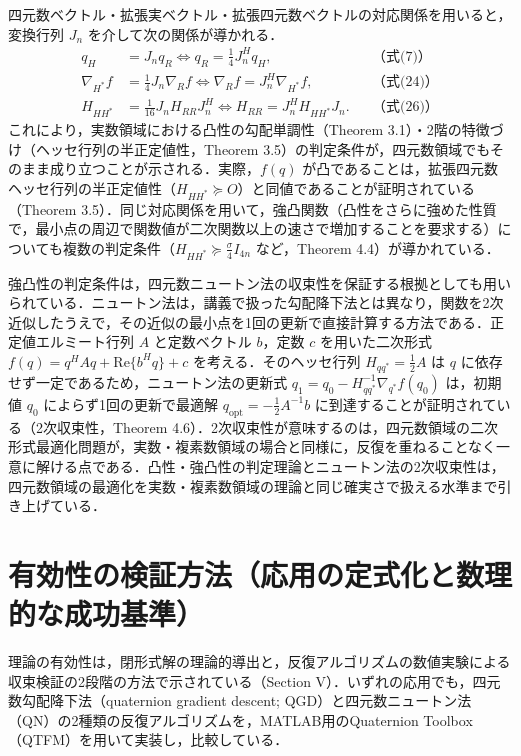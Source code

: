 \documentclass[twocolumn, 9pt]{jsarticle}
\begin{document}
四元数ベクトル・拡張実ベクトル・拡張四元数ベクトルの対応関係を用いると，変換行列 $J_n$ を介して次の関係が導かれる．
\begin{align*}
q_H &= J_nq_R \iff q_R = \tfrac{1}{4}J_n^Hq_H, &&\text{（式(7)）}\\
\nabla_{H^*}f &= \tfrac{1}{4}J_n\nabla_Rf \iff \nabla_Rf = J_n^H\nabla_{H^*}f, &&\text{（式(24)）}\\
H_{HH^*} &= \tfrac{1}{16}J_nH_{RR}J_n^H \iff H_{RR} = J_n^HH_{HH^*}J_n. &&\text{（式(26)）}
\end{align*}
これにより，実数領域における凸性の勾配単調性（Theorem 3.1）・2階の特徴づけ（ヘッセ行列の半正定値性，Theorem 3.5）の判定条件が，四元数領域でもそのまま成り立つことが示される．実際，$f(q)$ が凸であることは，拡張四元数ヘッセ行列の半正定値性（$H_{HH^*} \succeq O$）と同値であることが証明されている（Theorem 3.5）．同じ対応関係を用いて，強凸関数（凸性をさらに強めた性質で，最小点の周辺で関数値が二次関数以上の速さで増加することを要求する）についても複数の判定条件（$H_{HH^*} \succeq \frac{\sigma}{4} I_{4n}$ など，Theorem 4.4）が導かれている．

強凸性の判定条件は，四元数ニュートン法の収束性を保証する根拠としても用いられている．ニュートン法は，講義で扱った勾配降下法とは異なり，関数を2次近似したうえで，その近似の最小点を1回の更新で直接計算する方法である．正定値エルミート行列 $A$ と定数ベクトル $b$，定数 $c$ を用いた二次形式 $f(q) = q^H A q + \mathrm{Re}\{b^H q\} + c$ を考える．そのヘッセ行列 $H_{qq^*} = \frac{1}{2}A$ は $q$ に依存せず一定であるため，ニュートン法の更新式 $q_1 = q_0 - H_{qq^*}^{-1} \nabla_{q^*} f(q_0)$ は，初期値 $q_0$ によらず1回の更新で最適解 $q_{\mathrm{opt}} = -\frac{1}{2}A^{-1}b$ に到達することが証明されている（2次収束性，Theorem 4.6）．2次収束性が意味するのは，四元数領域の二次形式最適化問題が，実数・複素数領域の場合と同様に，反復を重ねることなく一意に解ける点である．凸性・強凸性の判定理論とニュートン法の2次収束性は，四元数領域の最適化を実数・複素数領域の理論と同じ確実さで扱える水準まで引き上げている．

\section{有効性の検証方法（応用の定式化と数理的な成功基準）}

理論の有効性は，閉形式解の理論的導出と，反復アルゴリズムの数値実験による収束検証の2段階の方法で示されている（Section V）．いずれの応用でも，四元数勾配降下法（quaternion gradient descent; QGD）と四元数ニュートン法（QN）の2種類の反復アルゴリズムを，MATLAB用のQuaternion Toolbox（QTFM）を用いて実装し，比較している．
\end{document}
